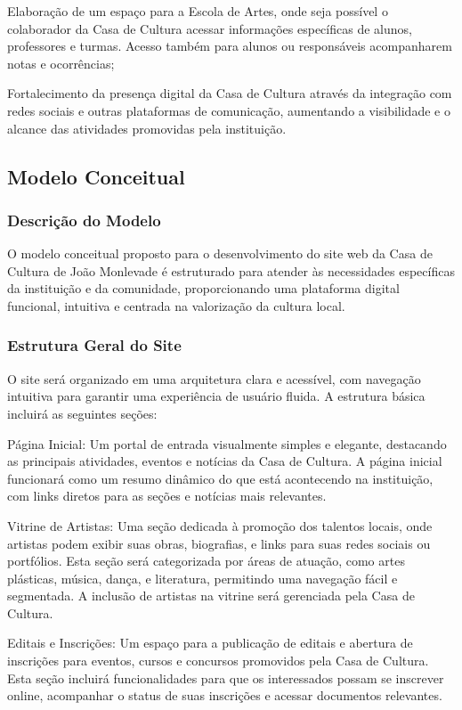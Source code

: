 Elaboração de um espaço para a Escola de Artes, onde seja possível o colaborador da Casa de Cultura acessar informações específicas de alunos, professores e turmas. Acesso também para alunos ou responsáveis acompanharem notas e ocorrências;

Fortalecimento da presença digital da Casa de Cultura através da integração com redes sociais e outras plataformas de comunicação, aumentando a visibilidade e o alcance das atividades promovidas pela instituição.

\subsection{Modelo Conceitual}

\subsubsection{Descrição do Modelo}

O modelo conceitual proposto para o desenvolvimento do site web da Casa de Cultura de João Monlevade é estruturado para atender às necessidades específicas da instituição e da comunidade, proporcionando uma plataforma digital funcional, intuitiva e centrada na valorização da cultura local.

\subsubsection{Estrutura Geral do Site}

O site será organizado em uma arquitetura clara e acessível, com navegação intuitiva para garantir uma experiência de usuário fluida. A estrutura básica incluirá as seguintes seções:

Página Inicial: Um portal de entrada visualmente simples e elegante, destacando as principais atividades, eventos e notícias da Casa de Cultura. A página inicial funcionará como um resumo dinâmico do que está acontecendo na instituição, com links diretos para as seções e notícias mais relevantes.

Vitrine de Artistas: Uma seção dedicada à promoção dos talentos locais, onde artistas podem exibir suas obras, biografias, e links para suas redes sociais ou portfólios. Esta seção será categorizada por áreas de atuação, como artes plásticas, música, dança, e literatura, permitindo uma navegação fácil e segmentada. A inclusão de artistas na vitrine será gerenciada pela Casa de Cultura.

Editais e Inscrições: Um espaço para a publicação de editais e abertura de inscrições para eventos, cursos e concursos promovidos pela Casa de Cultura. Esta seção incluirá funcionalidades para que os interessados possam se inscrever online, acompanhar o status de suas inscrições e acessar documentos relevantes.


